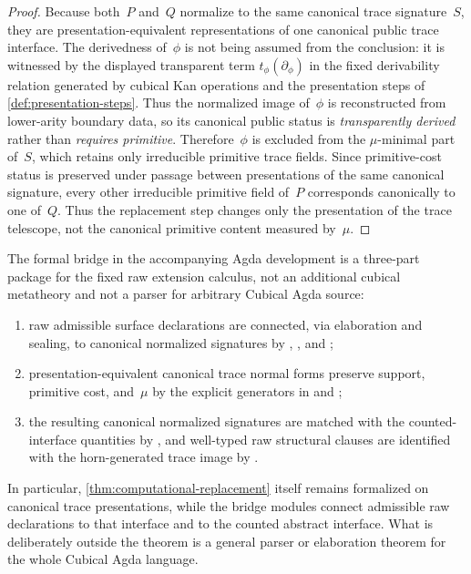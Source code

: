 \documentclass{lmcs}
\begin{document}
\begin{proof}
Because both~$P$ and~$Q$ normalize to the same canonical trace signature~$S$, they are presentation-equivalent representations of one canonical public trace interface. The derivedness of~$\phi$ is not being assumed from the conclusion: it is witnessed by the displayed transparent term $t_\phi(\partial_\phi)$ in the fixed derivability relation generated by cubical Kan operations and the presentation steps of \autoref{def:presentation-steps}. Thus the normalized image of~$\phi$ is reconstructed from lower-arity boundary data, so its canonical public status is \emph{transparently derived} rather than \emph{requires primitive}. Therefore~$\phi$ is excluded from the $\mu$-minimal part of~$S$, which retains only irreducible primitive trace fields. Since primitive-cost status is preserved under passage between presentations of the same canonical signature, every other irreducible primitive field of~$P$ corresponds canonically to one of~$Q$. Thus the replacement step changes only the presentation of the trace telescope, not the canonical primitive content measured by~$\mu$.
\end{proof}

\begin{rem}
\label{rem:bridge-target}
The formal bridge in the accompanying Agda development is a three-part package for the fixed raw extension calculus, not an additional cubical metatheory and not a parser for arbitrary Cubical Agda source:
\begin{enumerate}
  \item raw admissible surface declarations are connected, via elaboration and sealing, to canonical normalized signatures by , , and ;
  \item presentation-equivalent canonical trace normal forms preserve support, primitive cost, and~$\mu$ by the explicit  generators in  and ;
  \item the resulting canonical normalized signatures are matched with the counted-interface quantities by , and well-typed raw structural clauses are identified with the horn-generated trace image by .
\end{enumerate}
In particular, \autoref{thm:computational-replacement} itself remains formalized on canonical trace presentations, while the bridge modules connect admissible raw declarations to that interface and to the counted abstract interface. What is deliberately outside the theorem is a general parser or elaboration theorem for the whole Cubical Agda language.
\end{rem}
\end{document}
